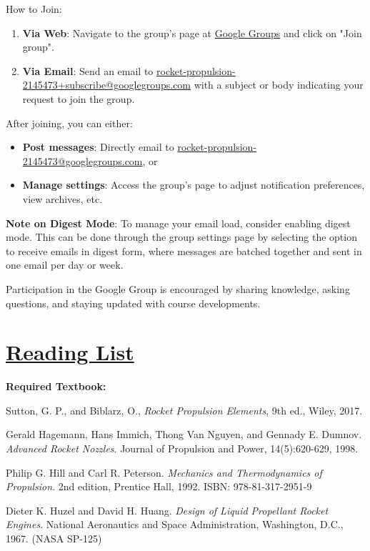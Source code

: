 \documentclass[12pt]{article}
\begin{document}
How to Join:
\begin{enumerate}
    \item \textbf{Via Web}: Navigate to the group's page at \href{https://groups.google.com/g/rocket-propulsion-2145473}{Google Groups} and click on "Join group".
    \item \textbf{Via Email}: Send an email to \href{mailto:rocket-propulsion-2145473+subscribe@googlegroups.com}{rocket-propulsion-2145473+subscribe@googlegroups.com} with a subject or body indicating your request to join the group. 
\end{enumerate}

After joining, you can either:
\begin{itemize}
    \item \textbf{Post messages}: Directly email to \href{mailto:rocket-propulsion-2145473@googlegroups.com}{rocket-propulsion-2145473@googlegroups.com}, or 
    \item \textbf{Manage settings}: Access the group's page to adjust notification preferences, view archives, etc.
\end{itemize}

\textbf{Note on Digest Mode}: To manage your email load, consider enabling digest mode. This can be done through the group settings page by selecting the option to receive emails in digest form, where messages are batched together and sent in one email per day or week.

Participation in the Google Group is encouraged by sharing knowledge, asking questions, and staying updated with course developments.

\section{\hyperref[sec:reading]{Reading List}}
\label{sec:reading}
\textbf{Required Textbook:}\\
\vspace{1pt}

Sutton, G. P., and Biblarz, O., \textit{Rocket Propulsion Elements}, 9th ed., Wiley, 2017.

\begin{thebibliography}{9}
Gerald Hagemann, Hans Immich, Thong Van Nguyen, and Gennady E. Dumnov. \textit{Advanced Rocket Nozzles}. Journal of Propulsion and Power, 14(5):620-629, 1998.

Philip G. Hill and Carl R. Peterson. \textit{Mechanics and Thermodynamics of Propulsion}. 2nd edition, Prentice Hall, 1992. ISBN: 978-81-317-2951-9

Dieter K. Huzel and David H. Huang. \textit{Design of Liquid Propellant Rocket Engines}. National Aeronautics and Space Administration, Washington, D.C., 1967. (NASA SP-125)
\end{thebibliography}
\end{document}
